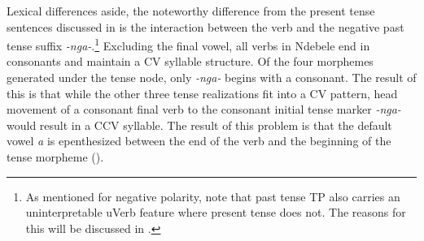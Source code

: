 \documentclass[output=paper]{langsci/langscibook}
\newcommand{\nga}[0]{\textit{-nga- }}
\begin{document}
\begin{exe}
\ex\label{ex:burkholder:11}
\end{exe}


% 
% 
% 


Lexical differences aside, the noteworthy difference from the present tense sentences discussed in  is the interaction between the verb and the negative past tense suffix \textit{-nga-}.\footnote{As mentioned for negative polarity, note that past tense TP also carries an uninterpretable uVerb feature where present tense does not. The reasons for this will be discussed in .} Excluding the final vowel, all verbs in Ndebele end in consonants and maintain a CV syllable structure. Of the four morphemes generated under the tense node, only \nga begins with a consonant. The result of this is that while the other three tense realizations fit into a CV pattern, head movement of a consonant final verb to the consonant initial tense marker \nga would result in a CCV syllable. The result of this problem is that the default vowel \textit{a} is epenthesized between the end of the verb and the beginning of the tense morpheme ().
\end{document}
